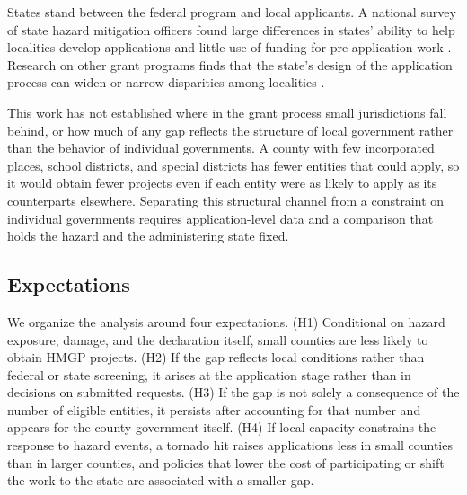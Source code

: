 States stand between the federal program and local applicants. A national survey of state hazard mitigation officers found large differences in states' ability to help localities develop applications and little use of funding for pre-application work \parencite{smith2020state,vila2022equity}. Research on other grant programs finds that the state's design of the application process can widen or narrow disparities among localities \parencite{collins2006redistributive,collins2008taken}.

This work has not established where in the grant process small jurisdictions fall behind, or how much of any gap reflects the structure of local government rather than the behavior of individual governments. A county with few incorporated places, school districts, and special districts has fewer entities that could apply, so it would obtain fewer projects even if each entity were as likely to apply as its counterparts elsewhere. Separating this structural channel from a constraint on individual governments requires application-level data and a comparison that holds the hazard and the administering state fixed.

\subsection{Expectations}
\label{sec:hypotheses}

We organize the analysis around four expectations. (H1) Conditional on hazard exposure, damage, and the declaration itself, small counties are less likely to obtain HMGP projects. (H2) If the gap reflects local conditions rather than federal or state screening, it arises at the application stage rather than in decisions on submitted requests. (H3) If the gap is not solely a consequence of the number of eligible entities, it persists after accounting for that number and appears for the county government itself. (H4) If local capacity constrains the response to hazard events, a tornado hit raises applications less in small counties than in larger counties, and policies that lower the cost of participating or shift the work to the state are associated with a smaller gap.
